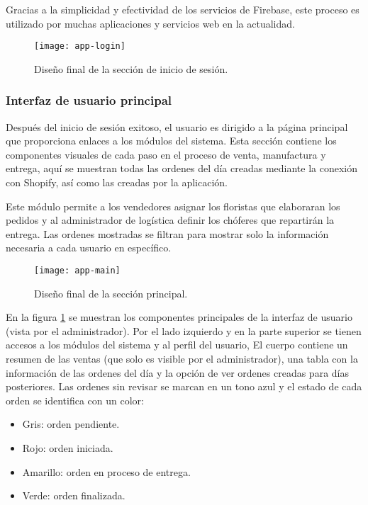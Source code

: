 

Gracias a la simplicidad y efectividad de los servicios de Firebase, este proceso es utilizado por muchas aplicaciones y servicios web en la actualidad.
\vspace{0.8cm}

\begin{figure}[H]
  \centering
  \texttt{[image: app-login]}
  \caption{Diseño final de la sección de inicio de sesión.}
\end{figure}

\subsubsection{Interfaz de usuario principal}
Después del inicio de sesión exitoso, el usuario es dirigido a la página principal que proporciona enlaces a los módulos del sistema. Esta sección contiene los componentes visuales de cada paso en el proceso de venta, manufactura y entrega, aquí se muestran todas las ordenes del día creadas mediante la conexión con Shopify, así como las creadas por la aplicación.

Este módulo permite a los vendedores asignar los floristas que elaboraran los pedidos y al administrador de logística definir los chóferes que repartirán la entrega. Las ordenes mostradas se filtran para mostrar solo la información necesaria a cada usuario en específico.
\vspace{0.8cm}

\begin{figure}[H]
  \centering
  \texttt{[image: app-main]}
  \caption{Diseño final de la sección principal.}
  \label{main-ui}
\end{figure}

En la figura \ref{main-ui} se muestran los componentes principales de la interfaz de usuario (vista por el administrador). Por el lado izquierdo y en la parte superior se tienen accesos a los módulos del sistema y al perfil del usuario, El cuerpo contiene un resumen de las ventas (que solo es visible por el administrador), una tabla con la información de las ordenes del día y la opción de ver ordenes creadas para días posteriores. Las ordenes sin revisar se marcan en un tono azul y el estado de cada orden se identifica con un color:

\begin{itemize}
  \item Gris: orden pendiente.
  \item Rojo: orden iniciada.
  \item Amarillo: orden en proceso de entrega.
  \item Verde: orden finalizada.
\end{itemize}

